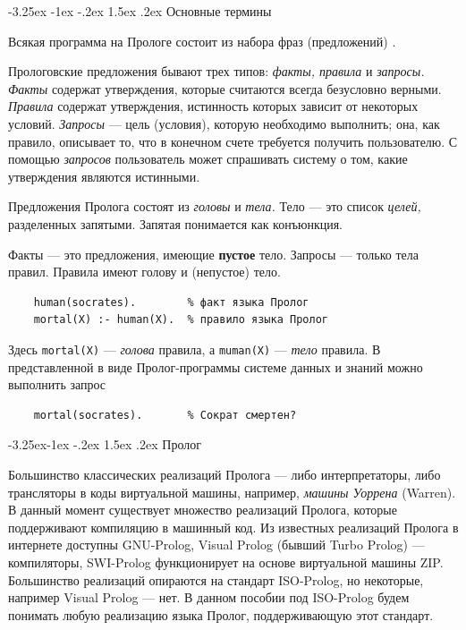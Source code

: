 \documentclass[12pt, openany, twoside]{book} %
\makeatletter
\renewcommand\section{\@startsection {section}{1}{\z@}%
                                   {-3.25ex \@plus -1ex \@minus -.2ex}%
                                   {1.5ex \@plus.2ex}%
                                   {\normalfont\large\bfseries}}
\renewcommand\subsection{\@startsection{subsection}{2}{\z@}%
                                     {-3.25ex\@plus -1ex \@minus -.2ex}%
                                     {1.5ex \@plus .2ex}%
                                     {\normalfont\normalsize\bfseries}}
\makeatother
\begin{document}
\section{Основные термины}

Всякая программа на Прологе состоит из набора фраз (предложений) \cite{Bratko}.

Прологовские предложения бывают трех типов: \emph{факты, правила} и \emph{запросы.} \emph{Факты} содержат утверждения, которые считаются всегда безусловно верными. \emph{Правила} содержат утверждения, истинность которых зависит от некоторых условий. \emph{Запросы} --- цель (условия), которую необходимо выполнить; она, как правило, описывает то, что в конечном счете требуется получить пользователю. С помощью \emph{запросов} пользователь может спрашивать систему о том, какие утверждения являются истинными.

Предложения Пролога состоят из \emph{головы} и \emph{тела.} Тело --- это список \emph{целей,} разделенных запятыми. Запятая понимается как конъюнкция.

Факты --- это предложения, имеющие {\bf пустое} тело. Запросы --- только тела правил. Правила имеют голову и (непустое) тело.

{\tt\begin{verbatim}
    human(socrates).        % факт языка Пролог
    mortal(X) :- human(X).  % правило языка Пролог
\end{verbatim}}

Здесь {\tt mortal(X)} --- {\em голова} правила, а {\tt muman(X)} --- {\em тело} правила. В представленной в виде Пролог-программы системе данных и знаний можно выполнить запрос
{\tt\begin{verbatim}
    mortal(socrates).       % Сократ смертен?
\end{verbatim}}


\subsection{Пролог}

Большинство классических реализаций Пролога --- либо интерпретаторы, либо трансляторы в коды виртуальной машины, например, {\em машины Уоррена} (Warren). В данный момент существует множество реализаций Пролога, которые поддерживают компиляцию в машинный код. Из известных реализаций Пролога в интернете доступны GNU-Prolog, Visual Prolog (бывший Turbo Prolog) --- компиляторы, SWI-Prolog функционирует на основе виртуальной машины ZIP. Большинство реализаций опираются на стандарт ISO-Prolog, но некоторые, например Visual Prolog --- нет. В данном пособии под ISO-Prolog будем понимать любую реализацию языка Пролог, поддерживающую этот стандарт.
\end{document}
